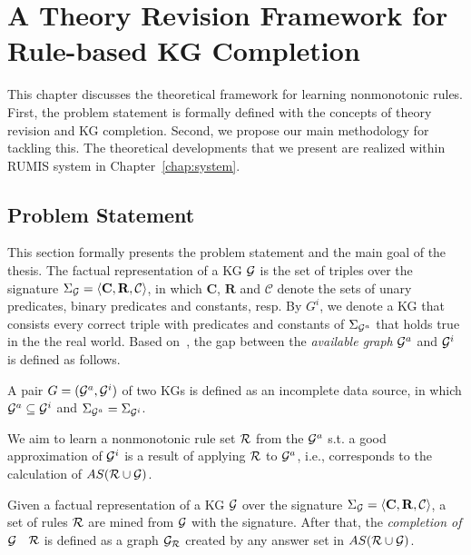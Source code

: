 \chapter{A Theory Revision Framework for Rule-based KG Completion}
\label{chap:frame}

This chapter discusses the theoretical framework for learning nonmonotonic rules. First, the problem statement is formally defined with the concepts of theory revision and KG completion. Second, we propose our main methodology for tackling this. The theoretical developments that we present are realized within RUMIS system in Chapter~\ref{chap:system}.

\section{Problem Statement}

This section formally presents the problem statement and the main goal of the thesis. The factual representation of a KG $\mathcal{G}$ is the set of triples over the signature $\Sigma_{\mathcal{G}}=\langle\mathbf{C},\mathbf{R},\mathcal{C}\rangle$, in which $\mathbf{C}$, $\mathbf{R}$ and $\mathcal{C}$ denote the sets of unary predicates, binary predicates and constants, resp. By $G^i$, we denote a KG that consists every correct triple with predicates and constants of $\Sigma_{\mathcal{G}^a}$ that holds true in the the real world. Based on~\cite{ref51}, the gap between the \emph{available graph} $\mathcal{G}^a$ and $\mathcal{G}^i$ is defined as follows.

\begin{definition} A pair $G = (\mathcal{G}^a, \mathcal{G}^i)$ of two KGs is defined as an incomplete data source, in which $\mathcal{G}^a\subseteq \mathcal{G}^i$ and $\Sigma_{\mathcal{G}^a}=\Sigma_{\mathcal{G}^i}$.
\end{definition}

We aim to learn a nonmonotonic rule set $\mathcal{R}$ from the $\mathcal{G}^a$ s.t. a good approximation of $\mathcal{G}^i$ is a result of applying $\mathcal{R}$ to $\mathcal{G}^a$, i.e., corresponds to the calculation of $AS(\mathcal{R} \cup \mathcal{G})$.

\begin{definition}\label{def:graphcompl}
Given a factual representation of a KG $\mathcal{G}$ over the signature $\Sigma_{\mathcal{G}}=\langle\mathbf{C},\mathbf{R},\mathcal{C}\rangle$, a set of rules $\mathcal{R}$ are mined from $\mathcal{G}$ with the signature. After that, the \emph{completion of $\mathcal{G}$ \wrt\ $\mathcal{R}$} is defined as a graph $\mathcal{G}_{\mathcal{R}}$ created by any answer set in $AS(\mathcal{R} \cup \mathcal{G})$.
\end{definition}

